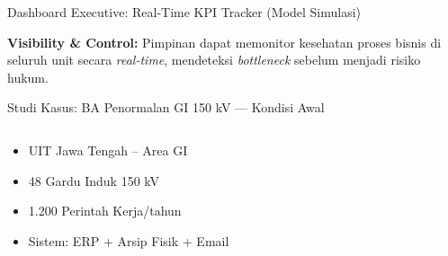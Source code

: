 \documentclass[aspectratio=169,11pt]{beamer}
\begin{document}
\begin{frame}{Dashboard Executive: Real-Time KPI Tracker (Model Simulasi)}
{%
    }
    \vspace{0.1cm}
    \begin{orangebox}
        \scriptsize \textbf{Visibility \& Control:} Pimpinan dapat memonitor kesehatan proses bisnis di seluruh unit secara \textit{real-time}, mendeteksi \textit{bottleneck} sebelum menjadi risiko hukum.
    \end{orangebox}
\end{frame}

\begin{frame}{Studi Kasus: BA Penormalan GI 150 kV --- Kondisi Awal}
    \vspace{0.1cm}
    \begin{columns}[T]
        \begin{orangebox}
            \scriptsize
            \begin{itemize}
                \item UIT Jawa Tengah -- Area GI
                \item 48 Gardu Induk 150 kV
                \item 1.200 Perintah Kerja/tahun
                \item Sistem: ERP + Arsip Fisik + Email
            \end{itemize}
        \end{orangebox}
        

\end{columns}
\end{frame}
\end{document}
